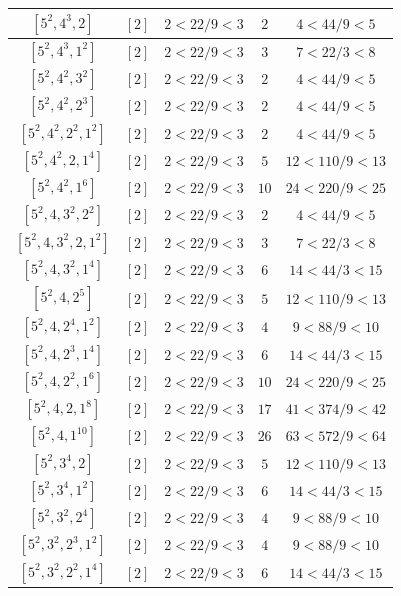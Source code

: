 \documentclass{article}%
\begin{document}
\begin{center}
\begin{longtable}{||c|c|c|c|c||}
$[5^{2}, 4^{3}, 2]$ & $[2]$ & $2 < 22/9 < 3$ & $2$ & $4 < 44/9 < 5$ \\ \hline 
$[5^{2}, 4^{3}, 1^{2}]$ & $[2]$ & $2 < 22/9 < 3$ & $3$ & $7 < 22/3 < 8$ \\ \hline 
$[5^{2}, 4^{2}, 3^{2}]$ & $[2]$ & $2 < 22/9 < 3$ & $2$ & $4 < 44/9 < 5$ \\ \hline 
$[5^{2}, 4^{2}, 2^{3}]$ & $[2]$ & $2 < 22/9 < 3$ & $2$ & $4 < 44/9 < 5$ \\ \hline 
$[5^{2}, 4^{2}, 2^{2}, 1^{2}]$ & $[2]$ & $2 < 22/9 < 3$ & $2$ & $4 < 44/9 < 5$ \\ \hline 
$[5^{2}, 4^{2}, 2, 1^{4}]$ & $[2]$ & $2 < 22/9 < 3$ & $5$ & $12 < 110/9 < 13$ \\ \hline 
$[5^{2}, 4^{2}, 1^{6}]$ & $[2]$ & $2 < 22/9 < 3$ & $10$ & $24 < 220/9 < 25$ \\ \hline 
$[5^{2}, 4, 3^{2}, 2^{2}]$ & $[2]$ & $2 < 22/9 < 3$ & $2$ & $4 < 44/9 < 5$ \\ \hline 
$[5^{2}, 4, 3^{2}, 2, 1^{2}]$ & $[2]$ & $2 < 22/9 < 3$ & $3$ & $7 < 22/3 < 8$ \\ \hline 
$[5^{2}, 4, 3^{2}, 1^{4}]$ & $[2]$ & $2 < 22/9 < 3$ & $6$ & $14 < 44/3 < 15$ \\ \hline 
$[5^{2}, 4, 2^{5}]$ & $[2]$ & $2 < 22/9 < 3$ & $5$ & $12 < 110/9 < 13$ \\ \hline 
$[5^{2}, 4, 2^{4}, 1^{2}]$ & $[2]$ & $2 < 22/9 < 3$ & $4$ & $9 < 88/9 < 10$ \\ \hline 
$[5^{2}, 4, 2^{3}, 1^{4}]$ & $[2]$ & $2 < 22/9 < 3$ & $6$ & $14 < 44/3 < 15$ \\ \hline 
$[5^{2}, 4, 2^{2}, 1^{6}]$ & $[2]$ & $2 < 22/9 < 3$ & $10$ & $24 < 220/9 < 25$ \\ \hline 
$[5^{2}, 4, 2, 1^{8}]$ & $[2]$ & $2 < 22/9 < 3$ & $17$ & $41 < 374/9 < 42$ \\ \hline 
$[5^{2}, 4, 1^{10}]$ & $[2]$ & $2 < 22/9 < 3$ & $26$ & $63 < 572/9 < 64$ \\ \hline 
$[5^{2}, 3^{4}, 2]$ & $[2]$ & $2 < 22/9 < 3$ & $5$ & $12 < 110/9 < 13$ \\ \hline 
$[5^{2}, 3^{4}, 1^{2}]$ & $[2]$ & $2 < 22/9 < 3$ & $6$ & $14 < 44/3 < 15$ \\ \hline 
$[5^{2}, 3^{2}, 2^{4}]$ & $[2]$ & $2 < 22/9 < 3$ & $4$ & $9 < 88/9 < 10$ \\ \hline 
$[5^{2}, 3^{2}, 2^{3}, 1^{2}]$ & $[2]$ & $2 < 22/9 < 3$ & $4$ & $9 < 88/9 < 10$ \\ \hline 
$[5^{2}, 3^{2}, 2^{2}, 1^{4}]$ & $[2]$ & $2 < 22/9 < 3$ & $6$ & $14 < 44/3 < 15$ \\ \hline 

\end{longtable}
\end{center}
\end{document}
